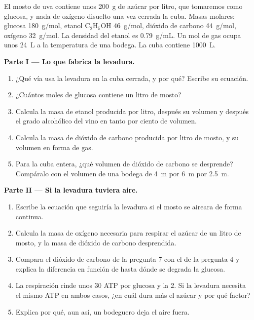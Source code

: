\begin{problem}
\label{pb:g10:cell-metabolism:1}
El mosto de uva contiene unos \qty{200}{g} de azúcar por litro, que
tomaremos como glucosa, y nada de oxígeno disuelto una vez cerrada la
cuba. Masas molares: glucosa \qty{180}{g/mol}, etanol
$\mathrm{C_2H_5OH}$ \qty{46}{g/mol}, dióxido de carbono
\qty{44}{g/mol}, oxígeno \qty{32}{g/mol}. La densidad del etanol es
\qty{0.79}{g/mL}. Un mol de gas ocupa unos \qty{24}{L} a la temperatura
de una bodega. La cuba contiene \qty{1000}{L}.

\medskip
\noindent\textbf{Parte I --- Lo que fabrica la levadura.}
\begin{enumerate}
  \item ¿Qué vía usa la levadura en la cuba cerrada, y por qué?
        Escribe su ecuación.
  \item ¿Cuántos moles de glucosa contiene un litro de mosto?
  \item Calcula la masa de etanol producida por litro, después su
        volumen y después el grado alcohólico del vino en tanto por
        ciento de volumen.
  \item Calcula la masa de dióxido de carbono producida por litro de
        mosto, y su volumen en forma de gas.
  \item Para la cuba entera, ¿qué volumen de dióxido de carbono se
        desprende? Compáralo con el volumen de una bodega de \qty{4}{m}
        por \qty{6}{m} por \qty{2.5}{m}.
\end{enumerate}

\medskip
\noindent\textbf{Parte II --- Si la levadura tuviera aire.}
\begin{enumerate}[resume]
  \item Escribe la ecuación que seguiría la levadura si el mosto se
        aireara de forma continua.
  \item Calcula la masa de oxígeno necesaria para respirar el azúcar de
        un litro de mosto, y la masa de dióxido de carbono desprendida.
  \item Compara el dióxido de carbono de la pregunta 7 con el de la
        pregunta 4 y explica la diferencia en función de hasta dónde se
        degrada la glucosa.
  \item La respiración rinde unos 30 ATP por glucosa y la 
        2. Si la levadura necesita el mismo ATP en ambos casos, ¿en
        cuál dura más el azúcar y por qué factor?
  \item Explica por qué, aun así, un bodeguero deja el aire fuera.
\end{enumerate}


\end{problem}
